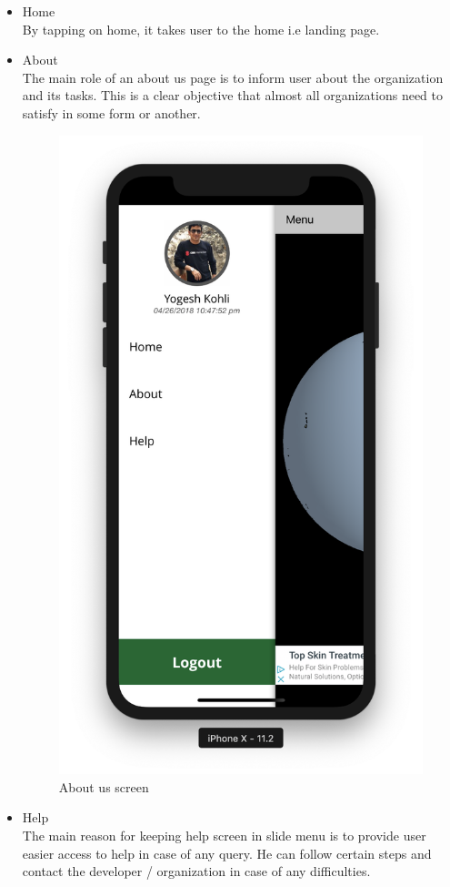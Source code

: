    \begin{itemize}
    \item Home \\
    By tapping on home, it takes user to the home i.e landing page.
    
        \item About \\
            The main role of an about us page is to inform user about the organization and its tasks. This is a clear objective that almost all organizations need to satisfy in some form or another.
            
        \begin{figure}[H]
            \centering
            \includegraphics[width=0.5\linewidth]{figures/ch2/side_menu.png}
            \caption{\label{fig:pass_recovery_1} About us screen}
        \end{figure}
        
        \newpage
        
         \item Help \\
            The main reason for keeping help screen in slide menu is to provide user easier access to help in case of any query. He can follow certain steps and contact the developer / organization in case of any difficulties.
            

\end{itemize}
